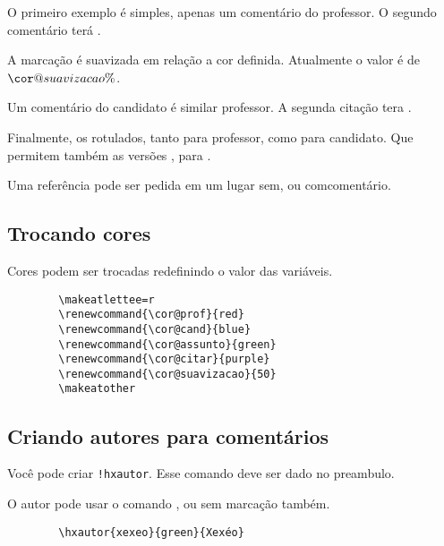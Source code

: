 \documentclass{article}
\begin{document}
    O primeiro exemplo é simples, apenas um comentário do professor.
    O segundo comentário terá .
    
    A marcação é suavizada em relação a cor definida. Atualmente o valor é de \makeatletter$\cor@suavizacao\%$\makeatother.
    
    Um comentário do candidato é similar professor. A segunda citação tera .
    
    Finalmente, os rotulados, tanto para professor, como para candidato. Que permitem também as versões , para .
    
    Uma referência pode ser pedida em um lugar sem\favorcitar, ou com\favorcitar[o experimento] comentário.
    
    \subsection{Trocando cores}
    Cores podem ser trocadas redefinindo o valor das variáveis.
    \begin{verbatim}
        \makeatlettee=r
        \renewcommand{\cor@prof}{red}
        \renewcommand{\cor@cand}{blue}
        \renewcommand{\cor@assunto}{green}
        \renewcommand{\cor@citar}{purple}
        \renewcommand{\cor@suavizacao}{50}
        \makeatother
    \end{verbatim}
    
    \subsection{Criando autores para comentários}
    Você pode criar  \verb*|!hxautor|. Esse comando deve ser dado no preambulo.
    
    O autor pode usar o comando , ou sem marcação também.
    
    \begin{verbatim}
        \hxautor{xexeo}{green}{Xexéo}
    \end{verbatim}
    
\end{document}
